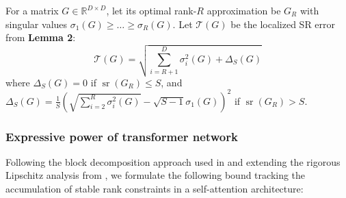 \documentclass[a4paper,14pt]{extarticle}
\DeclareMathOperator{\sr}{sr}
\begin{document}
    For a matrix $G\in \mathbb{R}^{D\times D}$, let its optimal rank-$R$ approximation be $G_R$ with singular values $\sigma_1(G) \geqslant \dots \geqslant \sigma_R(G)$. Let $\mathcal{T}(G)$ be the localized SR error from \textbf{Lemma 2}:
    $$\mathcal{T}(G) = \sqrt{\sum\limits_{i=R+1}^{D}\sigma_i^2(G) + \Delta_S(G)}$$
    where $\Delta_S(G) = 0$ if $\sr(G_R) \leqslant S$, and $\Delta_S(G) = \frac{1}{S}\left(\sqrt{\sum_{i=2}^R\sigma_i^2(G)} - \sqrt{S - 1}\sigma_1(G)\right)^2$ if $\sr(G_R) > S$.




    \subsubsection{Expressive power of transformer network}

    Following the block decomposition approach used in \cite{yun2019transformers} and extending the rigorous Lipschitz analysis from \cite{virmaux2018lipschitz}, we formulate the following bound tracking the accumulation of stable rank constraints in a self-attention architecture:
\end{document}
